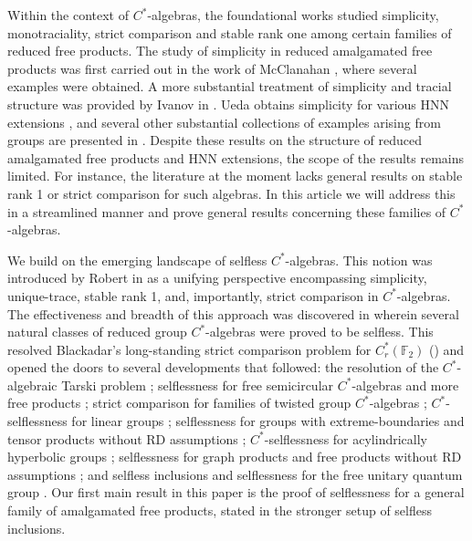 \documentclass{amsart}
\theoremstyle{definition}
\begin{document}
Within the context of $C^*$-algebras, the foundational works \cite{Avitzour, Dykemasimplicitystablerankonefree, stablerankHaagerup, dykema1998projections}  studied simplicity, monotraciality, strict comparison and stable rank one among certain families of reduced free products. The study of simplicity in reduced amalgamated free products was first carried out in the work of McClanahan \cite{McClanahan1994}, where several examples were obtained. A more substantial treatment of simplicity and tracial structure was provided by Ivanov in \cite{ivanov2007structurereducedamalgamatedfree}. Ueda obtains simplicity for various HNN extensions \cite{Ueda2008Remarks}, and several other substantial collections of examples arising from groups are presented in \cite{HarpePreaux2011, IvanovOmland2017, Bryder_Ivanov_Omland_2020}. Despite these results on the structure of reduced amalgamated free products and HNN extensions, the scope of the results remains limited. For instance, the literature at the moment lacks general results on stable rank 1 or strict comparison for such algebras. In this article we will address this in a streamlined manner and prove general results concerning these families of $C^*$-algebras.

We build on the emerging landscape of selfless $C^*$-algebras. This notion was introduced by Robert in \cite{robertselfless} as a unifying perspective encompassing simplicity, unique-trace, stable rank 1, and, importantly, strict comparison in $C^*$-algebras. The effectiveness and breadth of this approach was discovered in \cite{amrutam2025strictcomparisonreducedgroup} wherein several natural classes of reduced group $C^*$-algebras were proved to be selfless. This resolved Blackadar's long-standing  strict comparison problem for $C^*_r(\mathbb{F}_2)$ (\cite{Blackadar_1989}) and opened the doors to several developments that followed: the resolution of the $C^*$-algebraic Tarski problem \cite{elayavalli2025negativeresolutioncalgebraictarski}; selflessness for free semicircular $C^*$-algebras and more free products \cite{HKER, elayavalli2025remarks}; strict comparison for families of twisted group $C^*$-algebras \cite{raum2025strictcomparisontwistedgroup, flores2026purenessstablerankreduced}; $C^*$-selflessness for linear groups \cite{vigdorovich2025structuralpropertiesreducedcalgebras, ozawa2025proximalityselflessnessgroupcalgebras, vigdorovich2026selflessreducedcalgebraslinear, avni2025mixedidentitieslineargroups}; selflessness for groups with extreme-boundaries and tensor products without RD assumptions \cite{ozawa2025proximalityselflessnessgroupcalgebras}; $C^*$-selflessness for acylindrically hyperbolic groups \cite{amrutam2025strictcomparisonreducedgroup, BradfordSisto2026, ozawa2025proximalityselflessnessgroupcalgebras, yang2025extreme}; selflessness for graph products and free products without RD assumptions \cite{fmmm2025selflessfreeprod}; and selfless inclusions and selflessness for the free unitary quantum group \cite{hayes2025selfless}. Our first main result in this paper is the proof of selflessness for a general family of amalgamated free products, stated in the stronger setup of selfless inclusions.
\end{document}
